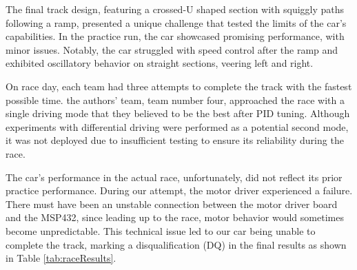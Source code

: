 \documentclass[conference]{IEEEtran}
\begin{document}
The final track design, featuring a crossed-U shaped section with squiggly paths following a ramp, presented a unique challenge that tested the limits of the car's capabilities. In the practice run, the car showcased promising performance, with minor issues. Notably, the car struggled with speed control after the ramp and exhibited oscillatory behavior on straight sections, veering left and right.

On race day, each team had three attempts to complete the track with the fastest possible time. the authors' team, team number four, approached the race with a single driving mode that they believed to be the best after PID tuning. Although experiments with differential driving were performed as a potential second mode, it was not deployed due to insufficient testing to ensure its reliability during the race.

The car's performance in the actual race, unfortunately, did not reflect its prior practice performance. During our attempt, the motor driver experienced a failure. There must have been an unstable connection between the motor driver board and the MSP432, since leading up to the race, motor behavior would sometimes become unpredictable. This technical issue led to our car being unable to complete the track, marking a disqualification (DQ) in the final results as shown in Table \ref{tab:raceResults}.
\end{document}

